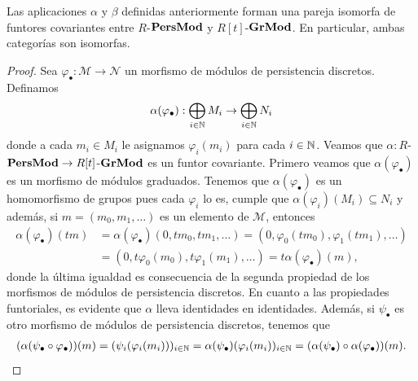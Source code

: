 \begin{lema}
	\label{lem:repr-carlsson-no-finito}
	Las aplicaciones \(\alpha\) y \(\beta\) definidas anteriormente forman una pareja isomorfa de funtores covariantes entre \(R\)-\(\mathbf{PersMod}\) y \(R[t]\)-\(\mathbf{GrMod}\). En particular, ambas categorías son isomorfas.
\end{lema}
\begin{proof}
	Sea \(\varphi_\bullet : \mathcal{M} \to \mathcal{N}\) un morfismo de módulos de persistencia discretos. Definamos
	\[
		\alpha(\varphi_{\bullet}) : \bigoplus_{i \in \mathbb{N}} M_i \to \bigoplus_{i \in \mathbb{N}} N_i
	\]
	donde a cada \(m_i \in M_i\) le asignamos \(\varphi_i(m_i)\) para cada \(i \in \mathbb{N}\). Veamos que \(\alpha : R\)-\(\mathbf{PersMod} \to R[t]\)-\(\mathbf{GrMod}\) es un funtor covariante. Primero veamos que \(\alpha(\varphi_{\bullet})\) es un morfismo de módulos graduados. Tenemos que \(\alpha(\varphi_{\bullet})\) es un homomorfismo de grupos pues cada \(\varphi_{i}\) lo es, cumple que \(\alpha(\varphi_{i})(M_i) \subseteq N_i\) y además, si \(m = (m_0, m_1, \ldots)\) es un elemento de \(\mathcal{M}\), entonces
	\begin{align*}
		\alpha(\varphi_{\bullet})(tm) &= \alpha(\varphi_{\bullet})(0, tm_0, tm_1, \ldots) = (0, \varphi_0(tm_0), \varphi_1(tm_1), \ldots) \\
		&= (0, t\varphi_0(m_0), t\varphi_1(m_1), \ldots) = t\alpha(\varphi_{\bullet})(m),
	\end{align*}
	donde la última igualdad es consecuencia de la segunda propiedad de los morfismos de módulos de persistencia discretos. 
	En cuanto a las propiedades funtoriales, es evidente que \(\alpha\) lleva identidades en identidades. Además, si \(\psi_\bullet\) es otro morfismo de módulos de persistencia discretos, tenemos que
	\begin{align*}
		(\alpha(\psi_\bullet \circ \varphi_\bullet))(m) = (\psi_i(\varphi_i(m_i)))_{i \in \mathbb{N}} = \alpha (\psi_\bullet)(\varphi_i(m_i))_{i \in \mathbb{N}} = (\alpha(\psi_\bullet) \circ \alpha(\varphi_\bullet))(m).
	\end{align*}
	

\end{proof}
